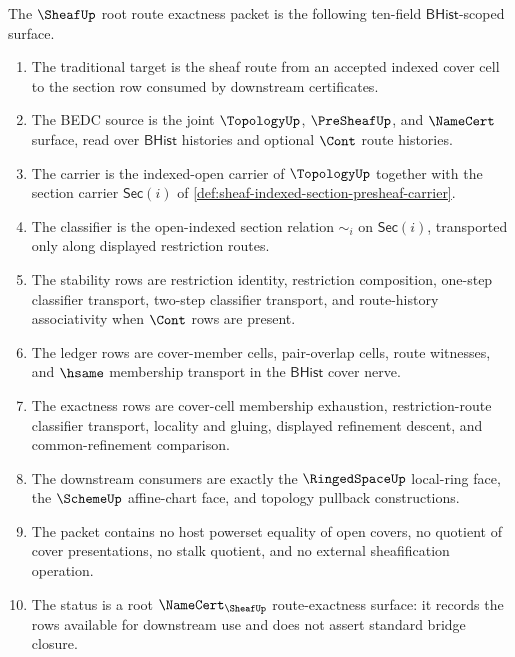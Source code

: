 \begin{definition}
\label{def:sheaf-root-route-exactness-packet}
The $\SheafUp$ root route exactness packet is the following ten-field $\mathsf{BHist}$-scoped surface.
\begin{enumerate}
\item The traditional target is the sheaf route from an accepted indexed cover cell to the section row consumed by downstream certificates.
\item The BEDC source is the joint $\TopologyUp$, $\PreSheafUp$, and $\NameCert$ surface, read over $\mathsf{BHist}$ histories and optional $\Cont$ route histories.
\item The carrier is the indexed-open carrier of $\TopologyUp$ together with the section carrier $\mathsf{Sec}(i)$ of \autoref{def:sheaf-indexed-section-presheaf-carrier}.
\item The classifier is the open-indexed section relation $\sim_i$ on $\mathsf{Sec}(i)$, transported only along displayed restriction routes.
\item The stability rows are restriction identity, restriction composition, one-step classifier transport, two-step classifier transport, and route-history associativity when $\Cont$ rows are present.
\item The ledger rows are cover-member cells, pair-overlap cells, route witnesses, and $\hsame$ membership transport in the $\mathsf{BHist}$ cover nerve.
\item The exactness rows are cover-cell membership exhaustion, restriction-route classifier transport, locality and gluing, displayed refinement descent, and common-refinement comparison.
\item The downstream consumers are exactly the $\RingedSpaceUp$ local-ring face, the $\SchemeUp$ affine-chart face, and topology pullback constructions.
\item The packet contains no host powerset equality of open covers, no quotient of cover presentations, no stalk quotient, and no external sheafification operation.
\item The status is a root $\NameCert_{\SheafUp}$ route-exactness surface: it records the rows available for downstream use and does not assert standard bridge closure.
\end{enumerate}
\end{definition}

